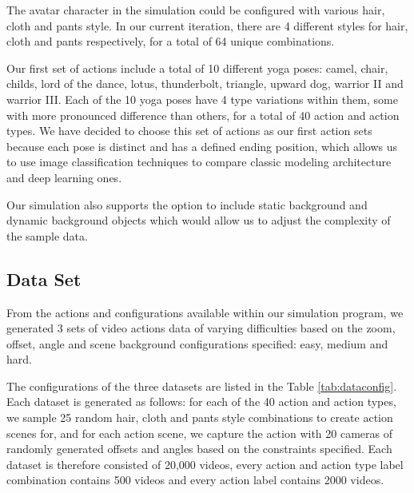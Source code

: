 \documentclass[
	a4paper, %
	10pt, %
	unnumberedsections, %
	twoside, %
]{t0004}
\begin{document}
The avatar character in the simulation could be configured with various hair, cloth and pants style. In our current iteration, there are 4 different styles for hair, cloth and pants respectively, for a total of 64 unique combinations.

Our first set of actions include a total of 10 different yoga poses: camel, chair, childs, lord of the dance, lotus, thunderbolt, triangle, upward dog, warrior II and warrior III. Each of the 10 yoga poses have 4 type variations within them, some with more pronounced difference than others,  for a total of 40 action and action types. We have decided to choose this set of actions as our first action sets because each pose is distinct and has a defined ending position, which allows us to use image classification techniques to compare classic modeling architecture and deep learning ones.

Our simulation also supports the option to include static background and dynamic background objects which would allow us to adjust the complexity of the sample data.

\subsection{Data Set} From the actions and configurations available within our simulation program, we generated 3 sets of video actions data of varying difficulties based on the zoom, offset, angle and scene background configurations specified: easy, medium and hard.

The configurations of the three datasets are listed in the Table \ref{tab:dataconfig}. Each dataset is generated as follows: for each of the 40 action and action types, we sample 25 random hair, cloth and pants style combinations to create action scenes for, and for each action scene, we capture the action with 20 cameras of randomly generated offsets and angles based on the constraints specified. Each dataset is therefore consisted of 20,000 videos, every action and action type label combination contains 500 videos and every action label contains 2000 videos.
\end{document}
